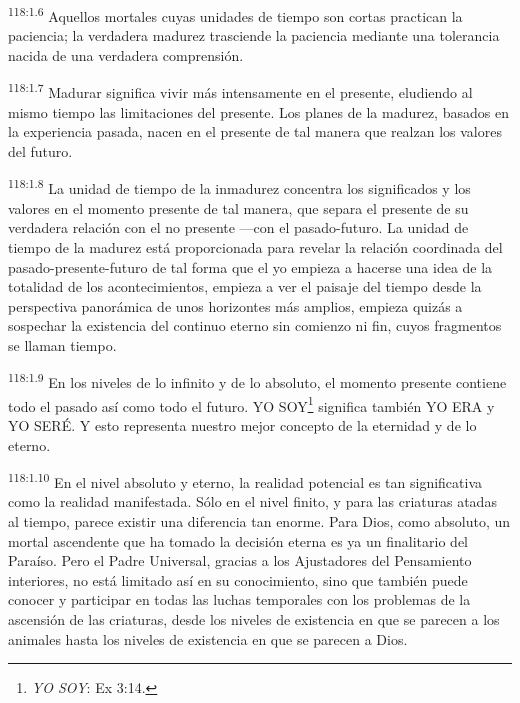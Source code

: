 \par
\textsuperscript{118:1.6} Aquellos mortales cuyas unidades de tiempo son cortas practican la paciencia; la verdadera madurez trasciende la paciencia mediante una tolerancia nacida de una verdadera comprensión.

\par
\textsuperscript{118:1.7} Madurar significa vivir más intensamente en el presente, eludiendo al mismo tiempo las limitaciones del presente. Los planes de la madurez, basados en la experiencia pasada, nacen en el presente de tal manera que realzan los valores del futuro.

\par
\textsuperscript{118:1.8} La unidad de tiempo de la inmadurez concentra los significados y los valores en el momento presente de tal manera, que separa el presente de su verdadera relación con el no presente ---con el pasado-futuro. La unidad de tiempo de la madurez está proporcionada para revelar la relación coordinada del pasado-presente-futuro de tal forma que el yo empieza a hacerse una idea de la totalidad de los acontecimientos, empieza a ver el paisaje del tiempo desde la perspectiva panorámica de unos horizontes más amplios, empieza quizás a sospechar la existencia del continuo eterno sin comienzo ni fin, cuyos fragmentos se llaman tiempo.

\par
\textsuperscript{118:1.9} En los niveles de lo infinito y de lo absoluto, el momento presente contiene todo el pasado así como todo el futuro. YO SOY\footnote{\textit{YO SOY}: Ex 3:14.} significa también YO ERA y YO SERÉ. Y esto representa nuestro mejor concepto de la eternidad y de lo eterno.

\par
\textsuperscript{118:1.10} En el nivel absoluto y eterno, la realidad potencial es tan significativa como la realidad manifestada. Sólo en el nivel finito, y para las criaturas atadas al tiempo, parece existir una diferencia tan enorme. Para Dios, como absoluto, un mortal ascendente que ha tomado la decisión eterna es ya un finalitario del Paraíso. Pero el Padre Universal, gracias a los Ajustadores del Pensamiento interiores, no está limitado así en su conocimiento, sino que también puede conocer y participar en todas las luchas temporales con los problemas de la ascensión de las criaturas, desde los niveles de existencia en que se parecen a los animales hasta los niveles de existencia en que se parecen a Dios.

